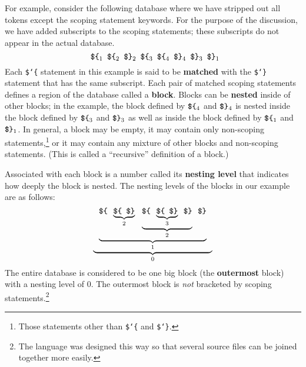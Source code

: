 For example, consider the following database where we have stripped out
all tokens except the scoping statement keywords.  For the purpose of the
discussion, we have added subscripts to the scoping statements; these subscripts
do not appear in the actual database.
\[
 \mbox{\tt \ \$\char`\{}_1
 \mbox{\tt \ \$\char`\{}_2
 \mbox{\tt \ \$\char`\}}_2
 \mbox{\tt \ \$\char`\{}_3
 \mbox{\tt \ \$\char`\{}_4
 \mbox{\tt \ \$\char`\}}_4
 \mbox{\tt \ \$\char`\}}_3
 \mbox{\tt \ \$\char`\}}_1
\]
Each \texttt{\$\char`\{} statement in this example is said to be {\bf
matched} with the \texttt{\$\char`\}} statement that has the same
subscript.  Each pair of matched scoping statements defines a region of
the database called a {\bf block}. Blocks can be {\bf
nested} inside of other blocks; in the example, the
block defined by $\mbox{\tt \$\char`\{}_4$ and $\mbox{\tt \$\char`\}}_4$
is nested inside the block defined by $\mbox{\tt \$\char`\{}_3$ and
$\mbox{\tt \$\char`\}}_3$ as well as inside the block defined by
$\mbox{\tt \$\char`\{}_1$ and $\mbox{\tt \$\char`\}}_1$.  In general, a
block may be empty, it may contain only non-scoping
statements,\footnote{Those statements other than \texttt{\$\char`\{} and
\texttt{\$\char`\}}.} or it may contain any
mixture of other blocks and non-scoping statements.  (This is called a
``recursive'' definition of a block.)

Associated with each block is a number called its {\bf nesting
level} that indicates how deeply the block is nested.
The nesting levels of the blocks in our example are as follows:
\[
  \underbrace{
    \mbox{\tt \ }
    \underbrace{
     \mbox{\tt \$\char`\{\ }
     \underbrace{
       \mbox{\tt \$\char`\{\ }
       \mbox{\tt \$\char`\}}
     }_{2}
     \mbox{\tt \ }
     \underbrace{
       \mbox{\tt \$\char`\{\ }
       \underbrace{
         \mbox{\tt \$\char`\{\ }
         \mbox{\tt \$\char`\}}
       }_{3}
       \mbox{\tt \ \$\char`\}}
     }_{2}
     \mbox{\tt \ \$\char`\}}
   }_{1}
   \mbox{\tt \ }
 }_{0}
\]
The entire database is considered to be one big block (the {\bf outermost}
block) with a nesting level of 0.  The outermost block is {\em not} bracketed
by scoping statements.\footnote{The language was designed this way so that
several source files can be joined together more easily.}

